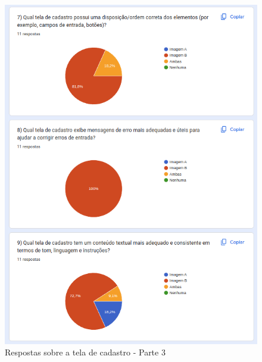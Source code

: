 \begin{figure}[!h]
	\begin{center}
	    \includegraphics[scale=0.7]{figs/Answers/Professionals/10.png}
	\end{center}
	\caption{\label{APC_TC03}Respostas sobre a tela de cadastro - Parte 3}
\end{figure}

\newpage

